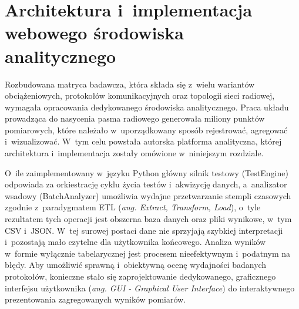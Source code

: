 \chapter{Architektura i~implementacja webowego środowiska analitycznego}
\label{chap:nuxt}

Rozbudowana matryca badawcza, która składa się z~wielu wariantów obciążeniowych, protokołów komunikacyjnych oraz topologii sieci radiowej, wymagała opracowania dedykowanego środowiska analitycznego.
Praca układu prowadząca do nasycenia pasma radiowego generowała miliony punktów pomiarowych, które należało w~uporządkowany sposób rejestrować, agregować i~wizualizować.
W~tym celu powstała autorska platforma analityczna, której architektura i~implementacja zostały omówione w~niniejszym rozdziale.

O~ile zaimplementowany w~języku Python główny silnik testowy (TestEngine) odpowiada za orkiestrację cyklu życia testów i~akwizycję danych, a~analizator wsadowy (BatchAnalyzer) umożliwia wydajne przetwarzanie stempli czasowych zgodnie z~paradygmatem ETL (\textit{ang. Extract, Transform, Load}), o~tyle rezultatem tych operacji jest obszerna baza danych oraz pliki wynikowe, w~tym CSV i~JSON.
W~tej surowej postaci dane nie sprzyjają szybkiej interpretacji i~pozostają mało czytelne dla użytkownika końcowego.
Analiza wyników w~formie wyłącznie tabelarycznej jest procesem nieefektywnym i~podatnym na błędy.
Aby umożliwić sprawną i~obiektywną ocenę wydajności badanych protokołów, konieczne stało się zaprojektowanie dedykowanego, graficznego interfejsu użytkownika (\textit{ang. GUI - Graphical User Interface}) do interaktywnego prezentowania zagregowanych wyników pomiarów.

